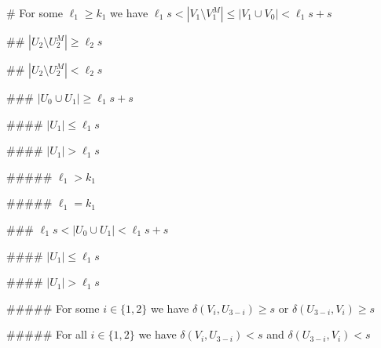 \documentclass[oneside,12pt]{memoir}
\begin{document}
\begin{easylist}
% 
% 
% 

% 
% 
% 

# For some $\ell_1\geq k_1$ we have $\ell_1s<|V_1\setminus V_1^M|\leq |V_1\cup V_0|<\ell_1s+s$

## $|U_2\setminus U_2^M|\geq \ell_2s$

## $|U_2\setminus U_2^M|<\ell_2s$

### $|U_0\cup U_1|\geq \ell_1s+s$

#### $|U_1|\leq \ell_1s$

#### $|U_1|>\ell_1s$

##### $\ell_1>k_1$

##### $\ell_1=k_1$



% 
% 
% 

% 
% 
% 

### $\ell_1s<|U_0\cup U_1|<\ell_1s+s$

#### $|U_1|\leq \ell_1s$
% 
% 
% 
% 
% 


#### $|U_1|>\ell_1s$






##### For some $i\in\{1,2\}$ we have $\delta(V_i, U_{3-i})\geq s$ or $\delta(U_{3-i}, V_i)\geq s$

##### For all $i\in\{1,2\}$ we have $\delta(V_i, U_{3-i})<s$ and $\delta(U_{3-i}, V_i)<s$

\end{easylist}
\end{document}

